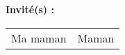{\vspace{\baselineskip}
{\normalTwelve \textbf{Invit\'{e}(s) :}}\\ \newline
\footnotesizeTwelve
\begin{tabular}{@{}ll}
Ma maman & Maman \\
\end{tabular}

}


\maketitle
